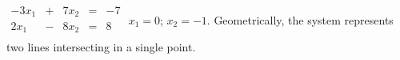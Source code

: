 {$\begin{array}{ccccc}
-3x_1&+&7x_2&=&-7\\
2x_1&-&8x_2&=&8\\
\end{array}$}
{$x_1=0$; $x_2=-1$. Geometrically, the system represents two lines intersecting in a single point.}